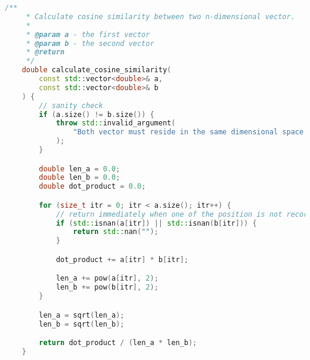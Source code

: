 \begin{lstlisting}[language=C++, caption=Implementasi fungsi \texttt{calculate\_cosine\_similarity}, label={bab5:cosine-similarity}]
    /**
     * Calculate cosine similarity between two n-dimensional vector.
     * 
     * @param a - the first vector
     * @param b - the second vector
     * @return 
     */
    double calculate_cosine_similarity(
        const std::vector<double>& a,
        const std::vector<double>& b
    ) {
        // sanity check
        if (a.size() != b.size()) {
            throw std::invalid_argument(
                "Both vector must reside in the same dimensional space."
            );
        }

        double len_a = 0.0;
        double len_b = 0.0;
        double dot_product = 0.0;

        for (size_t itr = 0; itr < a.size(); itr++) {
            // return immediately when one of the position is not recorded
            if (std::isnan(a[itr]) || std::isnan(b[itr])) {
                return std::nan("");
            }

            dot_product += a[itr] * b[itr];

            len_a += pow(a[itr], 2);
            len_b += pow(b[itr], 2);
        }

        len_a = sqrt(len_a);
        len_b = sqrt(len_b);

        return dot_product / (len_a * len_b);
    }
\end{lstlisting}

